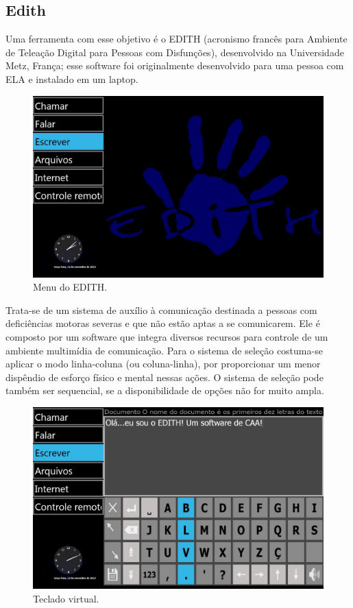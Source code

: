 \documentclass[twoside]{article}
\begin{document}
\begin{multicols}{2}
\subsection{Edith}
Uma ferramenta com esse objetivo é o EDITH (acronismo francês para Ambiente de Teleação Digital para Pessoas com Disfunções), desenvolvido na Universidade Metz, França; esse software foi originalmente desenvolvido para uma pessoa com ELA e instalado em um laptop.

\begin{figure}[H]
\label{fig:edith_menu}
  \caption{Menu do EDITH.}
  \centering
    \includegraphics[scale = 0.18]{edith_menu.png}
\end{figure}

Trata-se de um sistema de auxílio à comunicação destinada a pessoas com deficiências motoras severas e que não estão aptas a se comunicarem. Ele é composto por um software que integra diversos recursos para controle de um ambiente multimídia de comunicação. Para o sistema de seleção costuma-se aplicar o modo linha-coluna (ou coluna-linha), por proporcionar um menor dispêndio de esforço físico e mental nessas ações. O sistema de seleção pode também ser sequencial, se a disponibilidade de opções não for muito ampla. 

\begin{figure}[H]
\label{fig:edith_tecladovirtual}
  \caption{Teclado virtual.}
  \centering
    \includegraphics[scale = 0.18]{edith_tecladovirtual.png}
\end{figure}


\end{multicols}
\end{document}
